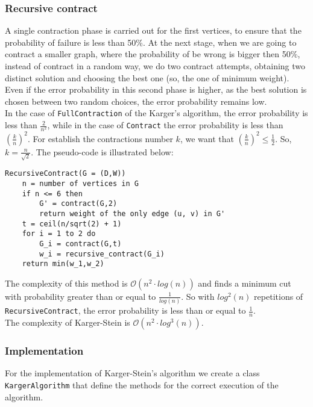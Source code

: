 \subsubsection*{Recursive contract}
A single contraction phase is carried out for the first vertices, to ensure that the probability of failure is less than 50\%. At the next stage, when we are going to contract a smaller graph, where the probability of be wrong is bigger then 50\%, instead of contract in a random way, we do two contract attempts, obtaining two distinct solution and choosing the best one (so, the one of minimum weight).\\
Even if the error probability in this second phase is higher, as the best solution is chosen between two random choices, the error probability remains low.\\
In the case of \verb|FullContraction| of the Karger's algorithm, the error probability is less than $\frac{2}{n^2}$, while in the case of \verb|Contract| the error probability is less than $(\frac{k}{n})^2$.
For establish the contractions number $k$, we want that $(\frac{k}{n})^2 \le \frac{1}{2}$. So, $k = \frac{n}{\sqrt2}$.
The pseudo-code is illustrated below:
\begin{verbatim}
RecursiveContract(G = (D,W))
    n = number of vertices in G 
    if n <= 6 then
        G' = contract(G,2)
        return weight of the only edge (u, v) in G'
    t = ceil(n/sqrt(2) + 1)
    for i = 1 to 2 do
        G_i = contract(G,t)
        w_i = recursive_contract(G_i)
    return min(w_1,w_2)
\end{verbatim}
\noindent
The complexity of this method is $\mathcal{O}(n^2 \cdot log(n))$ and finds a minimum cut with probability greater than or equal to $\frac{1}{log(n)}$. So with $log^2(n)$ repetitions of \verb|RecursiveContract|, the error probability is less than or equal to $\frac{1}{n}$.\\
The complexity of Karger-Stein is $\mathcal{O}(n^2 \cdot log^3(n))$.

\subsubsection{Implementation}
For the implementation of Karger-Stein's algorithm we create a class \verb|KargerAlgorithm| that define the methods for the correct execution of the algorithm.

